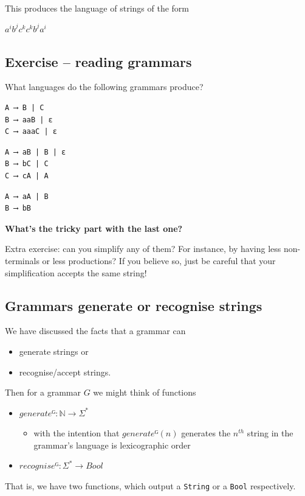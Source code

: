 \documentclass[11pt]{article}
\theoremstyle{definition}
\begin{document}
This produces the language of strings of
the form
\begin{center}
\(a^{i}b^{j}c^{k}c^{k}b^{j}a^{i}\)
\end{center}

\subsection{Exercise – reading grammars}
\label{sec:org7e41844}
What languages do the following grammars produce?

\begin{verbatim}
A ⟶ B | C
B ⟶ aaB | ε
C ⟶ aaaC | ε
\end{verbatim}

\begin{verbatim}
A ⟶ aB | B | ε
B ⟶ bC | C
C ⟶ cA | A
\end{verbatim}

\begin{verbatim}
A ⟶ aA | B
B ⟶ bB
\end{verbatim}

\textbf{What's the tricky part with the last one?}

Extra exercise: can you simplify any of them?
For instance, by having less non-terminals or less productions?
If you believe so, just be careful that
your simplification accepts the same string!

\subsection{Grammars generate or recognise strings}
\label{sec:org4f12455}
We have discussed the facts that a grammar can
\begin{itemize}
\item generate strings or
\item recognise/accept strings.
\end{itemize}

Then for a grammar \(G\) we might think of functions
\begin{itemize}
\item \(generateᴳ : ℕ → Σ^{*}\)
\begin{itemize}
\item with the intention that \(generateᴳ(n)\) generates the \(n^{th}\)
string in the grammar's language is lexicographic order
\end{itemize}
\item \(recogniseᴳ : Σ^{*} → Bool\)
\end{itemize}
That is, we have two functions, which output a \texttt{String} or
a \texttt{Bool} respectively.
\end{document}
